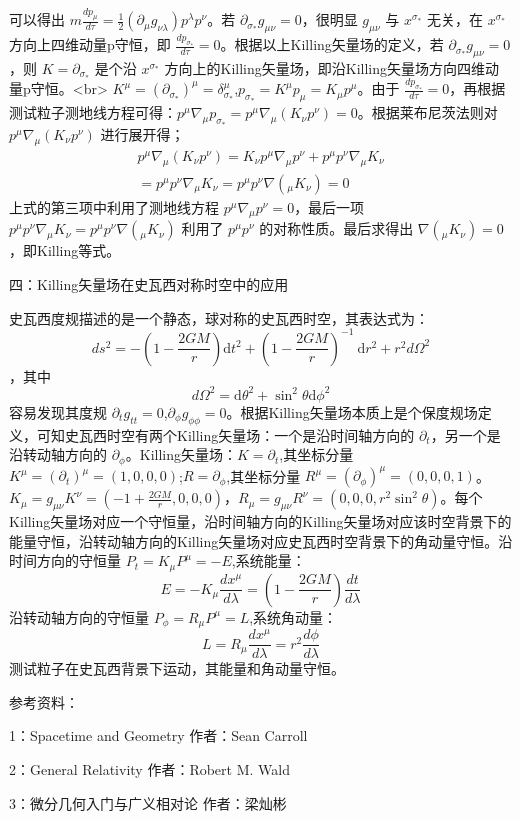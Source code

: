 可以得出 $m\frac{d p_{\mu}}{d \tau}=\frac{1}{2}\left(\partial_{\mu} g_{\nu \lambda}\right) p^{\lambda} p^{\nu}$。若 $\partial_{\sigma_{*}} g_{\mu \nu}=0$，很明显 $g_{\mu \nu}$ 与 $x^{\sigma_{*}}$ 无关，在 $x^{\sigma_{*}}$ 方向上四维动量p守恒，即 $\frac{d p_{\sigma_{*}}}{d \tau}=0$。根据以上Killing矢量场的定义，若 $\partial_{\sigma_{*}} g_{\mu \nu}=0$，则 $K=\partial_{\sigma_{*}}$ 是个沿 $x^{\sigma_{*}}$ 方向上的Killing矢量场，即沿Killing矢量场方向四维动量p守恒。<br>
$K^{\mu}=(\partial_{\sigma_{*}})^{\mu}=\delta_{\sigma_{*}}^{\mu}$,$p_{\sigma_{*}}=K^{\mu}p_{\mu}=K_{\mu}p^{\mu}$。由于 $\frac{d p_{\sigma_{*}}}{d \tau}=0$，再根据测试粒子测地线方程可得：$p^{\mu} \nabla_{\mu} p_{\sigma_{*}}=p^{\mu} \nabla_{\mu}(K_{\nu}p^{\nu}) =0$。根据莱布尼茨法则对 $p^{\mu} \nabla_{\mu}(K_{\nu}p^{\nu})$ 进行展开得；
$$\begin{aligned}
p^{\mu} \nabla_{\mu}(K_{\nu}p^{\nu})=K_{\nu}p^{\mu} \nabla_{\mu}p^{\nu}+p^{\mu} p^{\nu}\nabla_{\mu}K_{\nu}\\
=p^{\mu} p^{\nu}\nabla_{\mu}K_{\nu}=p^{\mu} p^{\nu}\nabla(_{\mu}K_{\nu})=0
\end{aligned}$$
上式的第三项中利用了测地线方程 $p^{\mu} \nabla_{\mu}p^{\nu}=0$，最后一项 $p^{\mu} p^{\nu}\nabla_{\mu}K_{\nu}=p^{\mu} p^{\nu}\nabla(_{\mu}K_{\nu})$ 利用了 $p^{\mu} p^{\nu}$ 的对称性质。最后求得出 $\nabla(_{\mu}K_{\nu})=0$，即Killing等式。

四：Killing矢量场在史瓦西对称时空中的应用

史瓦西度规描述的是一个静态，球对称的史瓦西时空，其表达式为：
$$d s^{2}=-\left(1-\frac{2 G M}{r}\right) \mathrm{d} t^{2}+\left(1-\frac{2 G M}{r}\right)^{-1} \mathrm{~d} r^{2}+r^{2} d \Omega^{2}$$，其中$$d \Omega^{2}=\mathrm{d} \theta^{2}+\sin ^{2} \theta \mathrm{d} \phi^{2}$$
容易发现其度规 $\partial_{t} g_{tt}=0$,$\partial_{\phi} g_{\phi\phi}=0$。根据Killing矢量场本质上是个保度规场定义，可知史瓦西时空有两个Killing矢量场：一个是沿时间轴方向的 $\partial_{t}$，另一个是沿转动轴方向的 $\partial_{\phi}$。Killing矢量场：$K=\partial_{t}$,其坐标分量 $K^{\mu}=\left(\partial_{t}\right)^{\mu}=(1,0,0,0)$;$R=\partial_{\phi}$,其坐标分量 $R^{\mu}=\left(\partial_{\phi}\right)^{\mu}=(0,0,0,1)$。$K_{\mu}=g_{\mu \nu}K^{\nu}=(-1+\frac{2 G M}{r},0,0,0)$，$R_{\mu}=g_{\mu \nu}R^{\nu}=(0,0,0,r^{2}\sin ^{2} \theta )$。每个Killing矢量场对应一个守恒量，沿时间轴方向的Killing矢量场对应该时空背景下的能量守恒，沿转动轴方向的Killing矢量场对应史瓦西时空背景下的角动量守恒。沿时间方向的守恒量 $P_{t}=K_{\mu}P^{\mu}=-E$,系统能量：$$E=-K_{\mu} \frac{d x^{\mu}}{d \lambda}=\left(1-\frac{2 G M}{r}\right) \frac{d t}{d \lambda}$$
沿转动轴方向的守恒量 $P_{\phi}=R_{\mu}P^{\mu}=L$,系统角动量：$$L=R_{\mu} \frac{d x^{\mu}}{d \lambda}=r^{2} \frac{d \phi}{d \lambda}$$
测试粒子在史瓦西背景下运动，其能量和角动量守恒。

参考资料：

1：Spacetime and Geometry 作者：Sean Carroll

2：General Relativity   作者：Robert M. Wald

3：微分几何入门与广义相对论  作者：梁灿彬